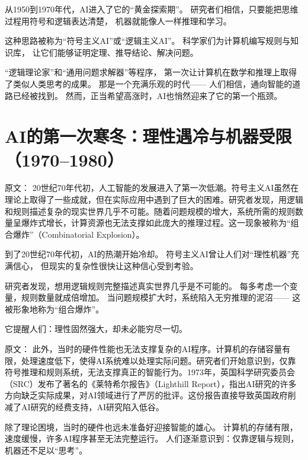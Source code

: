 
从1950到1970年代，AI进入了它的“黄金探索期”。
研究者们相信，只要能把思维过程用符号和逻辑表达清楚，
机器就能像人一样推理和学习。

这种思路被称为“符号主义AI”或“逻辑主义AI”。
科学家们为计算机编写规则与知识库，
让它们能够证明定理、推导结论、解决问题。

“逻辑理论家”和“通用问题求解器”等程序，
第一次让计算机在数学和推理上取得了类似人类思考的成果。
那是一个充满乐观的时代——
人们相信，通向智能的道路已经被找到。
然而，正当希望高涨时，AI也悄然迎来了它的第一个瓶颈。

\section{AI的第一次寒冬：理性遇冷与机器受限（1970–1980）}

原文：
20世纪70年代初，人工智能的发展进入了第一次低潮。符号主义AI虽然在理论上取得了一些成就，但在实际应用中遇到了巨大的困难。研究者发现，用逻辑和规则描述复杂的现实世界几乎不可能。随着问题规模的增大，系统所需的规则数量呈爆炸式增长，计算资源也无法支撑如此庞大的推理过程。这一现象被称为“组合爆炸”（Combinatorial Explosion）。


到了20世纪70年代初，AI的热潮开始冷却。
符号主义AI曾让人们对“理性机器”充满信心，
但现实的复杂性很快让这种信心受到考验。

研究者发现，想用逻辑规则完整描述真实世界几乎是不可能的。
每多考虑一个变量，规则数量就成倍增加。
当问题规模扩大时，系统陷入无穷推理的泥沼——
这被形象地称为“组合爆炸”。

它提醒人们：理性固然强大，却未必能穷尽一切。

原文：
此外，当时的硬件性能也无法支撑复杂的AI程序。计算机的存储容量有限，处理速度低下，使得AI系统难以处理实际问题。研究者们开始意识到，仅靠符号推理和规则系统，无法支撑真正的智能行为。1973年，英国科学研究委员会（SRC）发布了著名的《莱特希尔报告》（Lighthill Report），指出AI研究的许多方向缺乏实际成果，对AI领域进行了严厉的批评。这份报告直接导致英国政府削减了AI研究的经费支持，AI研究陷入低谷。


除了理论困境，当时的硬件也远未准备好迎接智能的雄心。
计算机的存储有限，速度缓慢，许多AI程序甚至无法完整运行。
人们逐渐意识到：仅靠逻辑与规则，机器还不足以“思考”。

